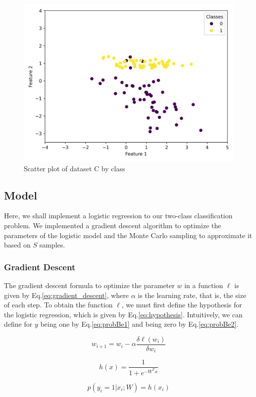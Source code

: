 \documentclass{article}
\begin{document}
\begin{figure}[h]
  \centering
  \includegraphics[width=0.49\linewidth]{scatter_3.png}
  \caption{Scatter plot of dataset C by class}
  \label{fig:data_discriminative}
\end{figure}

\subsection{Model}

Here, we shall implement a logistic regression to our two-class classification problem. We implemented a gradient descent algorithm to optimize the parameters of the logistic model and the Monte Carlo sampling to approximate it based on $S$ samples.

\subsubsection{Gradient Descent}

The gradient descent formula to optimize the parameter $w$ in a function $\ell$ is given by Eq.\eqref{eq:gradient_descent}, where $\alpha$ is the learning rate, that is, the size of each step. To obtain the function $\ell$, we must first define the hypothesis for the logistic regression, which is given by Eq.\eqref{eq:hypothesis}. Intuitively, we can define for $y$ being one by Eq.\eqref{eq:probBe1} and being zero by Eq.\eqref{eq:probBe2}.

\begin{equation}
  \label{eq:gradient_descent}
  w_{i+1} = w_{i} - \alpha \frac{\delta \ell(w_i)}{\delta w_i}
\end{equation}

\begin{equation}
  \label{eq:hypothesis}
  h(x) = \dfrac{1}{1 + e^{-W^{T} x}}
\end{equation}

\begin{equation}
  \label{eq:probBe1}
  p(y_i=1|x_i;W) = h(x_i)
\end{equation}
\end{document}
